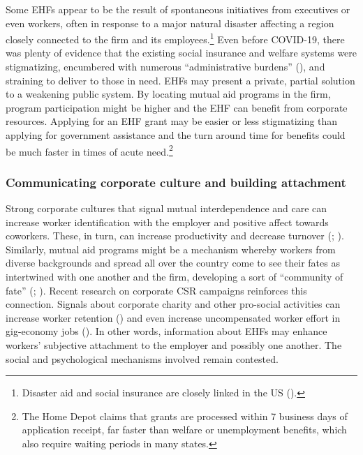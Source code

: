 \documentclass[
  11pt,
  oneside]{article}
\begin{document}
Some EHFs appear to be the result of spontaneous initiatives from executives or even workers, often in response to a major natural disaster affecting a region closely connected to the firm and its employees.\footnote{Disaster aid and social insurance are closely linked in the US ().} Even before COVID-19, there was plenty of evidence that the existing social insurance and welfare systems were stigmatizing, encumbered with numerous ``administrative burdens'' (), and straining to deliver to those in need. EHFs may present a private, partial solution to a weakening public system. By locating mutual aid programs in the firm, program participation might be higher and the EHF can benefit from corporate resources. Applying for an EHF grant may be easier or less stigmatizing than applying for government assistance and the turn around time for benefits could be much faster in times of acute need.\footnote{The Home Depot claims that grants are processed within 7 business days of application receipt, far faster than welfare or unemployment benefits, which also require waiting periods in many states.}

\subsubsection{Communicating corporate culture and building attachment}\label{communicating-corporate-culture-and-building-attachment}

Strong corporate cultures that signal mutual interdependence and care can increase worker identification with the employer and positive affect towards coworkers. These, in turn, can increase productivity and decrease turnover (; ). Similarly, mutual aid programs might be a mechanism whereby workers from diverse backgrounds and spread all over the country come to see their fates as intertwined with one another and the firm, developing a sort of ``community of fate'' (; ). Recent research on corporate CSR campaigns reinforces this connection. Signals about corporate charity and other pro-social activities can increase worker retention () and even increase uncompensated worker effort in gig-economy jobs (). In other words, information about EHFs may enhance workers' subjective attachment to the employer and possibly one another. The social and psychological mechanisms involved remain contested.
\end{document}
